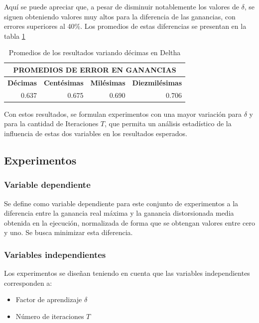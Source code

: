 Aquí se puede apreciar que, a pesar de disminuir notablemente los valores de $\delta$, se siguen obteniendo valores muy altos para la diferencia de las ganancias, con errores superiores al 40\%. Los promedios de estas diferencias se presentan en la tabla \ref{delthas_0000}

\begin{table}[H]
\centering
\caption{Promedios de los resultados variando décimas en Deltha}
\begin{tabular}{llll} \\ \hline  
\multicolumn{4}{c}{\textbf{PROMEDIOS DE ERROR EN GANANCIAS}}                                                  \\ \hline  
\textbf{Décimas}          & \textbf{Centésimas}       & \textbf{Milésimas}        & \textbf{Diezmilésimas}    \\ \hline  
\multicolumn{1}{r}{0.637} & \multicolumn{1}{r}{0.675} & \multicolumn{1}{r}{0.690} & \multicolumn{1}{r}{0.706} \\ \hline  
\end{tabular}
\label{delthas_0000}
\end{table}

Con estos resultados, se formulan experimentos con una mayor variación para $\delta$ y para la cantidad de Iteraciones $T$, que permita un análisis estadístico de la influencia de estas dos variables en los resultados esperados.

\subsection{Experimentos}

\subsubsection{Variable dependiente}

Se define como variable dependiente para este conjunto de experimentos a la diferencia entre la ganancia real máxima y la ganancia distorsionada media obtenida en la ejecución, normalizada de forma que se obtengan valores entre cero y uno. Se busca minimizar esta diferencia.

\subsubsection{Variables independientes}
Los experimentos se diseñan teniendo en cuenta que las variables independientes corresponden a: 
\begin{itemize}
    \item Factor de aprendizaje $\delta$
    \item Número de iteraciones $T$
\end{itemize}

